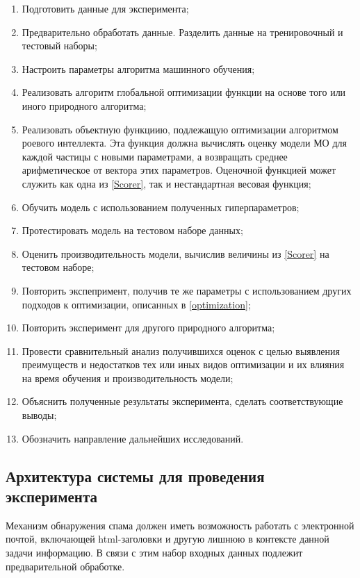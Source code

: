 \begin{enumerate}
    \item Подготовить данные для эксперимента;
    \item Предварительно обработать данные. Разделить данные на тренировочный
    и тестовый наборы;
    \item Настроить параметры алгоритма машинного обучения;
    \item Реализовать алгоритм глобальной оптимизации функции на основе того или иного природного алгоритма;
    \item Реализовать объектную функциию, подлежащую оптимизации алгоритмом роевого интеллекта.
    Эта функция должна вычислять оценку модели МО для каждой частицы с новыми параметрами, а
    возвращать среднее арифметическое от вектора этих параметров.
    Оценочной функцией может служить как одна из \ref{Scorer}, так и
    нестандартная весовая функция;
    \item Обучить модель с использованием полученных гиперпараметров;
    \item Протестировать модель на тестовом наборе данных;
    \item Оценить производительность модели, вычислив величины из \ref{Scorer} на
    тестовом наборе;
    \item Повторить экспепримент, получив те же параметры с использованием
    других подходов к оптимизации, описанных в \ref{optimization};
    \item Повторить эксперимент для другого природного алгоритма;
    \item Провести сравнительный анализ получившихся оценок с целью выявления
    преимуществ и недостатков тех или иных видов оптимизации и их влияния на
    время обучения и производительность модели;
    \item Объяснить полученные результаты эксперимента, сделать соответствующие выводы;
    \item Обозначить направление дальнейших исследований.
\end{enumerate}

\subsection{Архитектура системы для проведения эксперимента}

Механизм обнаружения спама должен иметь возможность работать с электронной почтой,
включающей html-заголовки и другую лишнюю в контексте данной задачи информацию.
В связи с этим набор входных данных подлежит предварительной обработке.

